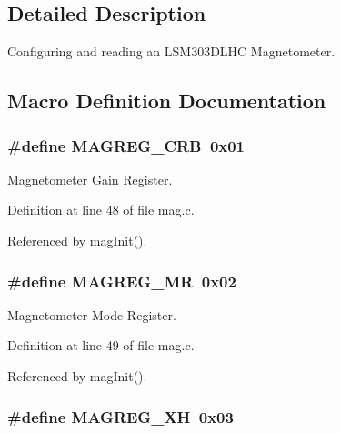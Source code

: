 \subsection{Detailed Description}
Configuring and reading an L\-S\-M303\-D\-L\-H\-C Magnetometer. 

\subsection{Macro Definition Documentation}
\hypertarget{group__mag_ga42f59dd3e4a9cb4d8d4dd4a1019b6ab5}{
\subsubsection[{M\-A\-G\-R\-E\-G\-\_\-\-C\-R\-B}]{\setlength{\rightskip}{0pt plus 5cm}\#define M\-A\-G\-R\-E\-G\-\_\-\-C\-R\-B~0x01}}\label{group__mag_ga42f59dd3e4a9cb4d8d4dd4a1019b6ab5}


Magnetometer Gain Register. 



Definition at line 48 of file mag.\-c.



Referenced by mag\-Init().

\hypertarget{group__mag_ga54eabf3b296f6550c9f6d9826020c623}{
\subsubsection[{M\-A\-G\-R\-E\-G\-\_\-\-M\-R}]{\setlength{\rightskip}{0pt plus 5cm}\#define M\-A\-G\-R\-E\-G\-\_\-\-M\-R~0x02}}\label{group__mag_ga54eabf3b296f6550c9f6d9826020c623}


Magnetometer Mode Register. 



Definition at line 49 of file mag.\-c.



Referenced by mag\-Init().

\hypertarget{group__mag_ga84e94fce89f9ba26ff3f33621c3a63bd}{
\subsubsection[{M\-A\-G\-R\-E\-G\-\_\-\-X\-H}]{\setlength{\rightskip}{0pt plus 5cm}\#define M\-A\-G\-R\-E\-G\-\_\-\-X\-H~0x03}}\label{group__mag_ga84e94fce89f9ba26ff3f33621c3a63bd}


